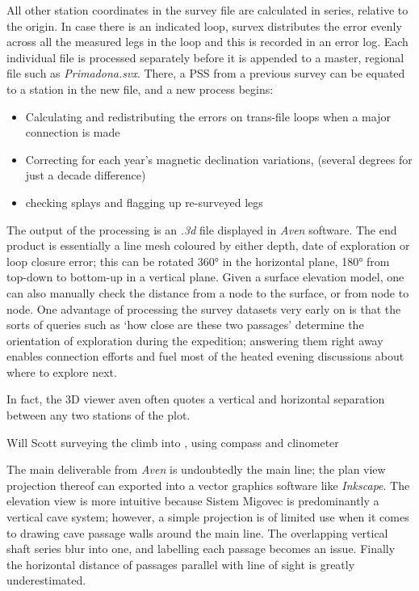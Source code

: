  All other station coordinates in the survey file are calculated in series, relative to the origin. In case there is an indicated loop, survex distributes the error evenly across all the measured legs in the loop and this is recorded in an error log. Each individual file is processed separately before it is appended to a master, regional file such as \emph{Primadona.svx}. There, a PSS from a previous survey can be equated to a station in the new file, and a new process begins:
\begin{itemize}
\item Calculating and redistributing the errors on trans-file loops when a major connection is made
\item Correcting for each year's magnetic declination variations, (several degrees for just a decade difference)
\item checking splays and flagging up re-surveyed legs 
\end{itemize}

The output of the processing is an \emph{.3d} file displayed in \emph{Aven} software. The end product is essentially a line mesh coloured by either depth, date of exploration or loop closure error; this can be rotated 360° in the horizontal plane, 180° from top-down to bottom-up in a vertical plane. Given a surface elevation model, one can also manually check the distance from a node to the surface, or from node to node. One advantage of processing the survey datasets very early on is that the sorts of queries such as `how close are these two passages' determine the orientation of exploration during the expedition; answering them right away enables connection efforts and fuel most of the heated evening discussions about where to explore next.

In fact, the 3D viewer aven often quotes a vertical and horizontal separation between any two stations of the plot.

\begin{marginfigure}
\checkoddpage \ifoddpage \forcerectofloat \else \forceversofloat \fi
\centering
 \caption{Will Scott surveying the climb into \protect{}, using compass and clinometer }
 \label{surveying colony}
\end{marginfigure}

The main deliverable from \emph{Aven} is undoubtedly the main line; the plan view projection thereof can exported into a vector graphics software like \emph{Inkscape}. The elevation view is more intuitive because Sistem Migovec is predominantly a vertical cave system; however, a simple projection is of limited use when it comes to drawing cave passage walls around the main line. The overlapping vertical shaft series blur into one, and labelling each passage becomes an issue. Finally the horizontal distance of passages parallel with line of sight is greatly underestimated.

